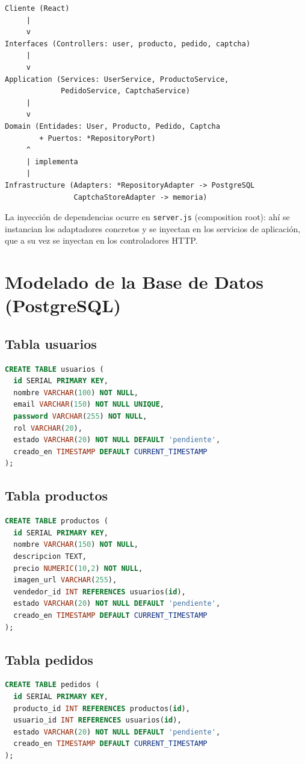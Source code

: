 \documentclass[11pt,a4paper]{article}
\begin{document}
\begin{verbatim}
Cliente (React)
     |
     v
Interfaces (Controllers: user, producto, pedido, captcha)
     |
     v
Application (Services: UserService, ProductoService,
             PedidoService, CaptchaService)
     |
     v
Domain (Entidades: User, Producto, Pedido, Captcha
        + Puertos: *RepositoryPort)
     ^
     | implementa
     |
Infrastructure (Adapters: *RepositoryAdapter -> PostgreSQL
                CaptchaStoreAdapter -> memoria)
\end{verbatim}
 
La inyección de dependencias ocurre en \texttt{server.js} (composition root): ahí se instancian los adaptadores concretos y se inyectan en los servicios de aplicación, que a su vez se inyectan en los controladores HTTP.
 
\section{Modelado de la Base de Datos (PostgreSQL)}
 
\subsection{Tabla usuarios}
\begin{lstlisting}[language=SQL]
CREATE TABLE usuarios (
  id SERIAL PRIMARY KEY,
  nombre VARCHAR(100) NOT NULL,
  email VARCHAR(150) NOT NULL UNIQUE,
  password VARCHAR(255) NOT NULL,
  rol VARCHAR(20),
  estado VARCHAR(20) NOT NULL DEFAULT 'pendiente',
  creado_en TIMESTAMP DEFAULT CURRENT_TIMESTAMP
);
\end{lstlisting}
 
\subsection{Tabla productos}
\begin{lstlisting}[language=SQL]
CREATE TABLE productos (
  id SERIAL PRIMARY KEY,
  nombre VARCHAR(150) NOT NULL,
  descripcion TEXT,
  precio NUMERIC(10,2) NOT NULL,
  imagen_url VARCHAR(255),
  vendedor_id INT REFERENCES usuarios(id),
  estado VARCHAR(20) NOT NULL DEFAULT 'pendiente',
  creado_en TIMESTAMP DEFAULT CURRENT_TIMESTAMP
);
\end{lstlisting}
 
\subsection{Tabla pedidos}
\begin{lstlisting}[language=SQL]
CREATE TABLE pedidos (
  id SERIAL PRIMARY KEY,
  producto_id INT REFERENCES productos(id),
  usuario_id INT REFERENCES usuarios(id),
  estado VARCHAR(20) NOT NULL DEFAULT 'pendiente',
  creado_en TIMESTAMP DEFAULT CURRENT_TIMESTAMP
);
\end{lstlisting}
 
\end{document}
